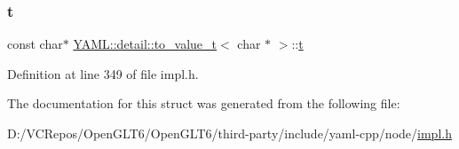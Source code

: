 \subsubsection{\texorpdfstring{t}{t}}
{\footnotesize\ttfamily const char$\ast$ \mbox{\hyperlink{struct_y_a_m_l_1_1detail_1_1to__value__t}{Y\+A\+M\+L\+::detail\+::to\+\_\+value\+\_\+t}}$<$ char $\ast$ $>$\+::\mbox{\hyperlink{glad_8h_aef9f00bf06d58b8db7e501e287488401}{t}}}



Definition at line 349 of file impl.\+h.



The documentation for this struct was generated from the following file\+:\begin{DoxyCompactItemize}
\item 
D\+:/\+V\+C\+Repos/\+Open\+G\+L\+T6/\+Open\+G\+L\+T6/third-\/party/include/yaml-\/cpp/node/\mbox{\hyperlink{impl_8h}{impl.\+h}}\end{DoxyCompactItemize}
